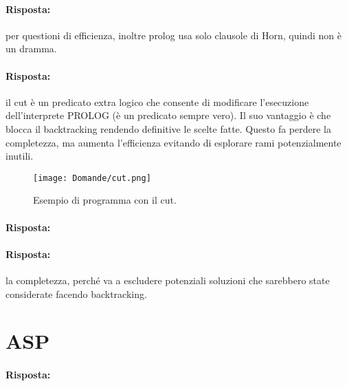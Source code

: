 \paragraph{Risposta:} per questioni di efficienza, inoltre prolog usa solo clausole di Horn, quindi non è un dramma. 


\paragraph{Risposta:} il cut è un predicato extra logico che consente di modificare l'esecuzione dell'interprete PROLOG (è un predicato sempre vero). Il suo vantaggio è che blocca il backtracking rendendo definitive le scelte fatte. Questo fa perdere la completezza, ma aumenta l'efficienza evitando di esplorare rami potenzialmente inutili.


\begin{figure}[h]
    \centering
    \texttt{[image: Domande/cut.png]}
    \caption{Esempio di programma con il cut.}
\end{figure}

\paragraph{Risposta:}


\paragraph{Risposta:} la completezza, perché va a escludere potenziali soluzioni che sarebbero state considerate facendo backtracking.


\section{ASP}




\paragraph{Risposta:}


